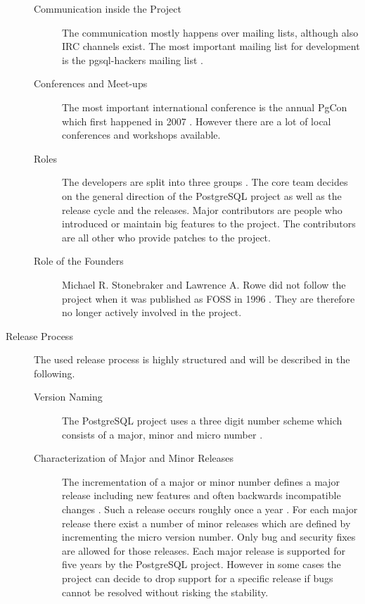 \begin{description}
\begin{description}
    \item[Communication inside the Project] The communication mostly happens
      over mailing lists, although also \ac{IRC} channels exist. The most
      important mailing list for development is the pgsql-hackers mailing list
      \cite{PostgreSQLDevFAQ}.

    \item[Conferences and Meet-ups] The most important international conference
      is the annual PgCon which first happened in 2007 \cite{PostgreSQLEvents}.
      However there are a lot of local conferences and workshops available.

    \item[Roles] The developers are split into three groups
      \cite{PostgreSQLContributors}. The core team decides on the general
      direction of the PostgreSQL project as well as the release cycle and the
      releases. Major contributors are people who introduced or maintain big
      features to the project. The contributors are all other who provide
      patches to the project.

    \item[Role of the Founders] Michael R. Stonebraker and Lawrence A. Rowe did
      not follow the project when it was published as \ac{FOSS} in 1996
      \cite{PostgreSQLHistory}. They are therefore no longer actively involved
      in the project.

  \end{description}

  \item[Release Process] The used release process is highly structured and will
    be described in the following.

  \begin{description}

    \item[Version Naming] The PostgreSQL project uses a three digit number
      scheme which consists of a major, minor and micro number
      \cite{PostgreSQLVersioning}.

    \item[Characterization of Major and Minor Releases] The incrementation of a
      major or minor number defines a major release including new features and
      often backwards incompatible changes \cite{PostgreSQLVersioning}. Such a
      release occurs roughly once a year
      \cite{PostgreSQLDevelopment,PostgreSQLFAQ}. For each major release there
      exist a number of minor releases which are defined by incrementing the
      micro version number. Only bug and security fixes are allowed for those
      releases. Each major release is supported for five years by the
      PostgreSQL project. However in some cases the project can decide to drop
      support for a specific release if bugs cannot be resolved without risking
      the stability.


\end{description}
\end{description}
